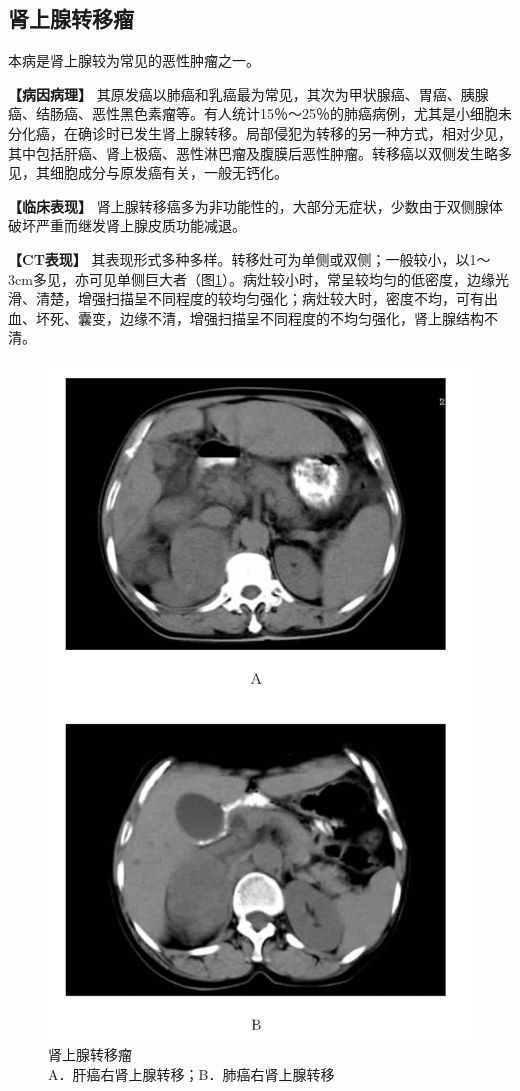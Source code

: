 \subsection{肾上腺转移瘤}

本病是肾上腺较为常见的恶性肿瘤之一。

\textbf{【病因病理】}
其原发癌以肺癌和乳癌最为常见，其次为甲状腺癌、胃癌、胰腺癌、结肠癌、恶性黑色素瘤等。有人统计15％～25％的肺癌病例，尤其是小细胞未分化癌，在确诊时已发生肾上腺转移。局部侵犯为转移的另一种方式，相对少见，其中包括肝癌、肾上极癌、恶性淋巴瘤及腹膜后恶性肿瘤。转移癌以双侧发生略多见，其细胞成分与原发癌有关，一般无钙化。

\textbf{【临床表现】}
肾上腺转移癌多为非功能性的，大部分无症状，少数由于双侧腺体破坏严重而继发肾上腺皮质功能减退。

\textbf{【CT表现】}
其表现形式多种多样。转移灶可为单侧或双侧；一般较小，以1～3cm多见，亦可见单侧巨大者（图\ref{fig16-4}）。病灶较小时，常呈较均匀的低密度，边缘光滑、清楚，增强扫描呈不同程度的较均匀强化；病灶较大时，密度不均，可有出血、坏死、囊变，边缘不清，增强扫描呈不同程度的不均匀强化，肾上腺结构不清。

\begin{figure}[!htbp]
 \centering
 \includegraphics[width=.7\textwidth,height=\textheight,keepaspectratio]{./images/Image00348.jpg}
 \captionsetup{justification=centering}
 \caption{肾上腺转移瘤\\{\small A．肝癌右肾上腺转移；B．肺癌右肾上腺转移}}
 \label{fig16-4}
  \end{figure} 

